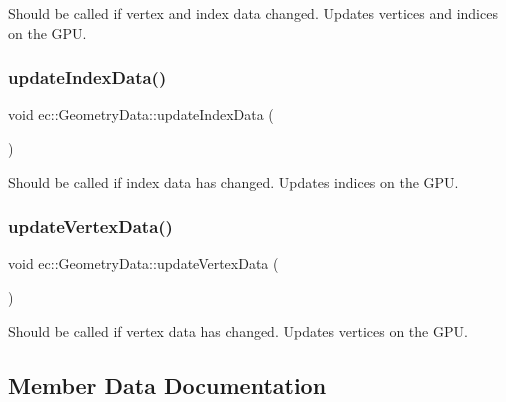 Should be called if vertex and index data changed. Updates vertices and indices on the G\+PU. 

\mbox{\label{classec_1_1_geometry_data_a23fd4a2619691fb7bbd5c0650544cce3}} 
\subsubsection{\texorpdfstring{update\+Index\+Data()}{updateIndexData()}}
{\footnotesize\ttfamily void ec\+::\+Geometry\+Data\+::update\+Index\+Data (\begin{DoxyParamCaption}{ }\end{DoxyParamCaption})}



Should be called if index data has changed. Updates indices on the G\+PU. 

\mbox{\label{classec_1_1_geometry_data_aeb93c2e5bd5f4656eaa12651cd4927aa}} 
\subsubsection{\texorpdfstring{update\+Vertex\+Data()}{updateVertexData()}}
{\footnotesize\ttfamily void ec\+::\+Geometry\+Data\+::update\+Vertex\+Data (\begin{DoxyParamCaption}{ }\end{DoxyParamCaption})}



Should be called if vertex data has changed. Updates vertices on the G\+PU. 



\subsection{Member Data Documentation}
\mbox{\label{classec_1_1_geometry_data_ab32858fa60eb5c6859c287d00b14357d}} 
